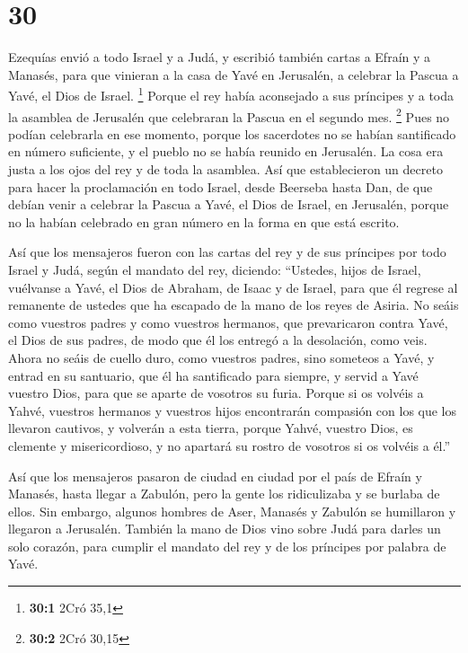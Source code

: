 \hypertarget{section-29}{%
\section{30}\label{section-29}}

 Ezequías envió a todo Israel y a Judá, y escribió también
cartas a Efraín y a Manasés, para que vinieran a la casa de Yavé en
Jerusalén, a celebrar la Pascua a Yavé, el Dios de Israel. \footnote{\textbf{30:1}
  2Cró 35,1}  Porque el rey había aconsejado a sus
príncipes y a toda la asamblea de Jerusalén que celebraran la Pascua en
el segundo mes. \footnote{\textbf{30:2} 2Cró 30,15}  Pues
no podían celebrarla en ese momento, porque los sacerdotes no se habían
santificado en número suficiente, y el pueblo no se había reunido en
Jerusalén.  La cosa era justa a los ojos del rey y de toda
la asamblea.  Así que establecieron un decreto para hacer
la proclamación en todo Israel, desde Beerseba hasta Dan, de que debían
venir a celebrar la Pascua a Yavé, el Dios de Israel, en Jerusalén,
porque no la habían celebrado en gran número en la forma en que está
escrito.

 Así que los mensajeros fueron con las cartas del rey y de
sus príncipes por todo Israel y Judá, según el mandato del rey,
diciendo: ``Ustedes, hijos de Israel, vuélvanse a Yavé, el Dios de
Abraham, de Isaac y de Israel, para que él regrese al remanente de
ustedes que ha escapado de la mano de los reyes de Asiria.
 No seáis como vuestros padres y como vuestros hermanos,
que prevaricaron contra Yavé, el Dios de sus padres, de modo que él los
entregó a la desolación, como veis.  Ahora no seáis de
cuello duro, como vuestros padres, sino someteos a Yavé, y entrad en su
santuario, que él ha santificado para siempre, y servid a Yavé vuestro
Dios, para que se aparte de vosotros su furia.  Porque si
os volvéis a Yahvé, vuestros hermanos y vuestros hijos encontrarán
compasión con los que los llevaron cautivos, y volverán a esta tierra,
porque Yahvé, vuestro Dios, es clemente y misericordioso, y no apartará
su rostro de vosotros si os volvéis a él.''

 Así que los mensajeros pasaron de ciudad en ciudad por
el país de Efraín y Manasés, hasta llegar a Zabulón, pero la gente los
ridiculizaba y se burlaba de ellos.  Sin embargo, algunos
hombres de Aser, Manasés y Zabulón se humillaron y llegaron a Jerusalén.
 También la mano de Dios vino sobre Judá para darles un
solo corazón, para cumplir el mandato del rey y de los príncipes por
palabra de Yavé.

